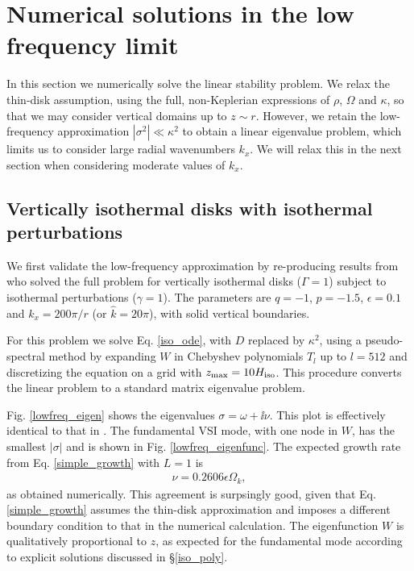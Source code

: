 \section{Numerical solutions in the low frequency limit}
In this section we numerically solve the linear stability problem.  
We relax the thin-disk assumption, using the full, non-Keplerian
expressions of $\rho$, $\Omega$ and $\kappa$, so that we may consider
vertical domains up to $z\sim r$. However, we retain the low-frequency
approximation $|\sigma^2|\ll\kappa^2$ to obtain a linear eigenvalue
problem, which limits us to consider large radial wavenumbers
$k_x$. We will relax this in the next section when considering
moderate values of $k_x$. %



\subsection{Vertically isothermal disks with isothermal perturbations}   
We first validate the low-frequency approximation by re-producing
results from \cite{mcnally14} who solved the full problem for
vertically isothermal disks ($\Gamma=1$) subject to isothermal
perturbations ($\gamma=1$). The parameters are $q=-1$,
$p=-1.5$, $\epsilon=0.1$ and $k_x = 200\pi/r$ (or $\hat{k} = 20\pi$),
with solid vertical boundaries. 

For this problem we solve Eq. \ref{iso_ode}, with $D$ replaced by
$\kappa^2$, using a pseudo-spectral
method by expanding $W$ in Chebyshev polynomials $T_l$ up to $l=512$
and discretizing the equation on a grid with
$z_\mathrm{max}=10H_\mathrm{iso}$. This procedure converts the linear problem
to a standard matrix eigenvalue problem.   

Fig. \ref{lowfreq_eigen} shows the eigenvalues $\sigma = \omega +
\ii\nu$. This plot is effectively identical to that in
\cite{mcnally14}. The fundamental VSI mode, with one node in $W$, has
the smallest $|\sigma|$ and is shown in Fig. \ref{lowfreq_eigenfunc}.  
The expected growth rate from Eq. \ref{simple_growth} with 
$L=1$ is  
\begin{align*}
  \nu = 0.2606\epsilon\Omega_k,
\end{align*}
as obtained numerically. This agreement is surpsingly good, given that
Eq. \ref{simple_growth} assumes the thin-disk approximation and
imposes a different boundary condition to that in the numerical
calculation. The eigenfunction $W$ is qualitatively proportional to
$z$, as expected for the fundamental mode according to explicit
solutions discussed in \S\ref{iso_poly}.    

